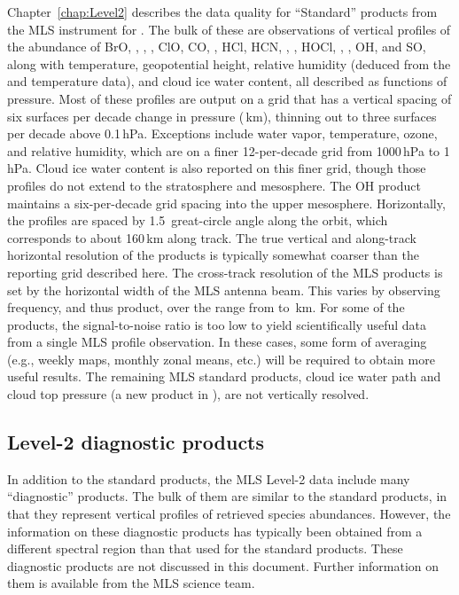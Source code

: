 Chapter~\ref{chap:Level2} describes the data quality for ``Standard'' products from the MLS instrument for \thisv. The bulk of these are observations of vertical profiles of the abundance of BrO, , , , ClO, CO, , HCl, HCN, , , HOCl, , , OH, and SO, along with temperature, geopotential height, relative humidity (deduced from the  and temperature data), and cloud ice water content, all described as functions of pressure. Most of these profiles are output on a grid that has a vertical spacing of six surfaces per decade change in pressure (\,km), thinning out to three surfaces per decade above 0.1\,hPa. Exceptions include water vapor, temperature, ozone, and relative humidity, which are on a finer 12-per-decade grid from 1000\,hPa to 1\,hPa. Cloud ice water content is also reported on this finer grid, though those profiles do not extend to the stratosphere and mesosphere. The OH product maintains a six-per-decade grid spacing into the upper mesosphere. Horizontally, the profiles are spaced by 1.5\degsym\ great-circle angle along the orbit, which corresponds to about 160\,km along track. The true vertical and along-track horizontal resolution of the products is typically somewhat coarser than the reporting grid described here. The cross-track resolution of the MLS products is set by the horizontal width of the MLS antenna beam. This varies by observing frequency, and thus product, over the range from  to \,km. For some of the products, the signal-to-noise ratio is too low to yield scientifically useful data from a single MLS profile observation. In these cases, some form of averaging (e.g., weekly maps, monthly zonal means, etc.) will be required to obtain more useful results. The remaining MLS standard products, cloud ice water path and cloud top pressure (a new product in \thisv), are not vertically resolved.


\subsection{Level-2 diagnostic products}
In addition to the standard products, the MLS \mbox{Level-2} data include many ``diagnostic'' products. The bulk of them are similar to the standard products, in that they represent vertical profiles of retrieved species abundances. However, the information on these diagnostic products has typically been obtained from a different spectral region than that used for the standard products. These diagnostic products are not discussed in this document. Further information on them is available from the MLS science team.

